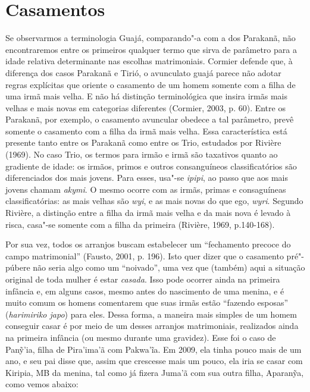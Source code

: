 \section{Casamentos}\label{casamentos}

Se observarmos a terminologia Guajá, comparando"-a com a dos Parakanã,
não encontraremos entre os primeiros qualquer termo que sirva de
parâmetro para a idade relativa determinante nas escolhas matrimoniais.
Cormier defende que, à diferença dos casos Parakanã e Tirió, o
avunculato guajá parece não adotar regras explícitas que oriente o
casamento de um homem somente com a filha de uma irmã mais velha. E não
há distinção terminológica que insira irmãs mais velhas e mais novas em
categorias diferentes (Cormier, 2003, p. 60). Entre os Parakanã, por
exemplo, o casamento avuncular obedece a tal parâmetro, prevê somente o
casamento com a filha da irmã mais velha. Essa característica está
presente tanto entre os Parakanã como entre os Trio, estudados por
Rivière (1969). No caso Trio, os termos para irmão e irmã são taxativos
quanto ao gradiente de idade: os irmãos, primos e outros consanguíneos
classificatórios são diferenciados dos mais jovens. Para esses, usa"-se
\emph{ipipi}, ao passo que aos mais jovens chamam \emph{akymi}. O mesmo
ocorre com as irmãs, primas e consaguíneas classificatórias: as mais
velhas são \emph{wyi}, e as mais novas do que ego, \emph{wyri}. Segundo
Rivière, a distinção entre a filha da irmã mais velha e da mais nova é
levado à risca, casa"-se somente com a filha da primeira (Rivière, 1969,
p.140-168).

Por sua vez, todos os arranjos buscam estabelecer um ``fechamento precoce
do campo matrimonial'' (Fausto, 2001, p. 196). Isto quer dizer que o
casamento pré"-púbere não seria algo como um ``noivado'', uma vez que
(também) aqui a situação original de toda mulher é estar \emph{casada}.
Isso pode ocorrer ainda na primeira infância e, em alguns casos, mesmo
antes do nascimento de uma menina, e é muito comum os homens comentarem
que suas irmãs estão ``fazendo esposas'' (\emph{harimiriko japo}) para
eles. Dessa forma, a maneira mais simples de um homem conseguir casar é
por meio de um desses arranjos matrimoniais, realizados ainda na
primeira infância (ou mesmo durante uma gravidez). Esse foi o caso de
Panỹ'ia, filha de Pira'ima'ã com Pakwa'ĩa. Em 2009, ela tinha pouco mais
de um ano, e seu pai disse que, assim que crescesse mais um pouco, ela
iria se casar com Kiripia, MB da menina, tal como já fizera Juma'ã com
sua outra filha, Aparanỹa, como vemos abaixo:

